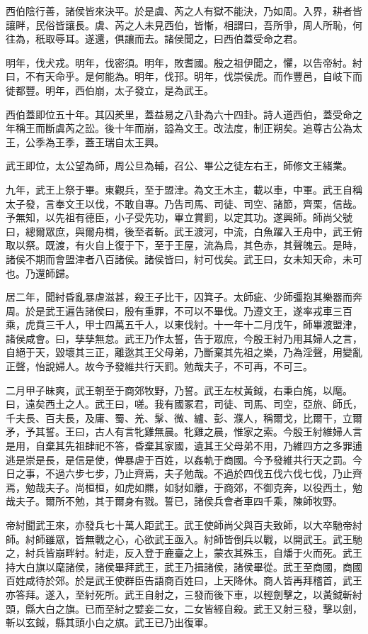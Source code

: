 西伯陰行善，諸侯皆來決平。於是虞、芮之人有獄不能決，乃如周。入界，耕者皆讓畔，民俗皆讓長。虞、芮之人未見西伯，皆慚，相謂曰，吾所爭，周人所恥，何往為，秖取辱耳。遂還，俱讓而去。諸侯聞之，曰西伯蓋受命之君。

明年，伐犬戎。明年，伐密須。明年，敗耆國。殷之祖伊聞之，懼，以告帝紂。紂曰，不有天命乎。是何能為。明年，伐邘。明年，伐崇侯虎。而作豐邑，自岐下而徙都豐。明年，西伯崩，太子發立，是為武王。

西伯蓋即位五十年。其囚羑里，蓋益易之八卦為六十四卦。詩人道西伯，蓋受命之年稱王而斷虞芮之訟。後十年而崩，謚為文王。改法度，制正朔矣。追尊古公為太王，公季為王季，蓋王瑞自太王興。

武王即位，太公望為師，周公旦為輔，召公、畢公之徒左右王，師修文王緒業。

九年，武王上祭于畢。東觀兵，至于盟津。為文王木主，載以車，中軍。武王自稱太子發，言奉文王以伐，不敢自專。乃告司馬、司徒、司空、諸節，齊栗，信哉。予無知，以先祖有德臣，小子受先功，畢立賞罰，以定其功。遂興師。師尚父號曰，總爾眾庶，與爾舟楫，後至者斬。武王渡河，中流，白魚躍入王舟中，武王俯取以祭。既渡，有火自上復于下，至于王屋，流為烏，其色赤，其聲魄云。是時，諸侯不期而會盟津者八百諸侯。諸侯皆曰，紂可伐矣。武王曰，女未知天命，未可也。乃還師歸。

居二年，聞紂昏亂暴虐滋甚，殺王子比干，囚箕子。太師疵、少師彊抱其樂器而奔周。於是武王遍告諸侯曰，殷有重罪，不可以不畢伐。乃遵文王，遂率戎車三百乘，虎賁三千人，甲士四萬五千人，以東伐紂。十一年十二月戊午，師畢渡盟津，諸侯咸會。曰，孳孳無怠。武王乃作太誓，告于眾庶，今殷王紂乃用其婦人之言，自絕于天，毀壞其三正，離逖其王父母弟，乃斷棄其先祖之樂，乃為淫聲，用變亂正聲，怡說婦人。故今予發維共行天罰。勉哉夫子，不可再，不可三。

二月甲子昧爽，武王朝至于商郊牧野，乃誓。武王左杖黃鉞，右秉白旄，以麾。曰，遠矣西土之人。武王曰，嗟。我有國冢君，司徒、司馬、司空，亞旅、師氏，千夫長、百夫長，及庸、蜀、羌、髳、微、纑、彭、濮人，稱爾戈，比爾干，立爾矛，予其誓。王曰，古人有言牝雞無晨。牝雞之晨，惟家之索。今殷王紂維婦人言是用，自棄其先祖肆祀不答，昏棄其家國，遺其王父母弟不用，乃維四方之多罪逋逃是崇是長，是信是使，俾暴虐于百姓，以姦軌于商國。今予發維共行天之罰。今日之事，不過六步七步，乃止齊焉，夫子勉哉。不過於四伐五伐六伐七伐，乃止齊焉，勉哉夫子。尚桓桓，如虎如羆，如豺如離，于商郊，不御克奔，以役西土，勉哉夫子。爾所不勉，其于爾身有戮。誓已，諸侯兵會者車四千乘，陳師牧野。

帝紂聞武王來，亦發兵七十萬人距武王。武王使師尚父與百夫致師，以大卒馳帝紂師。紂師雖眾，皆無戰之心，心欲武王亟入。紂師皆倒兵以戰，以開武王。武王馳之，紂兵皆崩畔紂。紂走，反入登于鹿臺之上，蒙衣其殊玉，自燔于火而死。武王持大白旗以麾諸侯，諸侯畢拜武王，武王乃揖諸侯，諸侯畢從。武王至商國，商國百姓咸待於郊。於是武王使群臣告語商百姓曰，上天降休。商人皆再拜稽首，武王亦答拜。遂入，至紂死所。武王自射之，三發而後下車，以輕劍擊之，以黃鉞斬紂頭，縣大白之旗。已而至紂之嬖妾二女，二女皆經自殺。武王又射三發，擊以劍，斬以玄鉞，縣其頭小白之旗。武王已乃出復軍。


